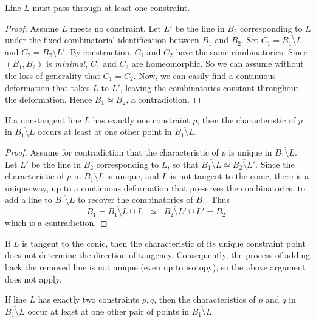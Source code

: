 \documentclass{svproc}
\begin{document}
\begin{lemma}\label{lemma_1}
Line $L$ must pass through at least one constraint.
\end{lemma}

\begin{proof}
Assume $L$ meets no constraint. Let $L'$ be the line in $B_2$ corresponding to $L$ under the fixed combinatorial identification between $B_1$ and $B_2$. 
Set $C_1=\overline{B_1\setminus L}$ and $C_2=\overline{B_2\setminus L'}$. 
By construction, $C_1$ and $C_2$ have the same combinatorics. Since $(B_1,B_2)$ is \emph{minimal}, $C_1$ and $C_2$ are homeomorphic. So we can assume without the loss of generality that $C_1 = C_2$. Now, we can easily find a continuous deformation that takes $L$ to $L'$, leaving the combinatorics constant throughout the deformation. Hence $B_1 \simeq B_2$, a contradiction.
\end{proof}

\begin{lemma}\label{lemma2}
If a non-tangent line $L$ has exactly one constraint $p$, then the characteristic of $p$ in 
$\overline{B_1 \setminus L}$ occurs at least at one other point in $\overline{B_1 \setminus L}$.
\end{lemma}

\begin{proof}
Assume for contradiction that the characteristic of $p$ is unique in 
$\overline{B_1 \setminus L}$.  
Let $L'$ be the line in $B_2$ corresponding to $L$, so that 
$\overline{B_1 \setminus L} \simeq \overline{B_2 \setminus L'}$.  
Since the characteristic of $p$ in $\overline{B_1 \setminus L}$ is unique, and $L$ is not tangent to the conic, there is a unique way, up to a continuous deformation that preserves the combinatorics, to add a line to $\overline{B_1 \setminus L}$ to recover 
the combinatorics of $B_1$.  
Thus
\[
B_1 = \overline{B_1 \setminus L} \cup L \;\;\simeq\;\; 
\overline{B_2 \setminus L'} \cup L' = B_2,
\]
which is a contradiction.
\end{proof}
\begin{remark}
  If $L$ is tangent to the conic, then the characteristic of its unique constraint point does not determine the direction of tangency. Consequently, the process of adding back the removed line is not unique (even up to isotopy), so the above argument does not apply.  
\end{remark}


\begin{lemma}
If line $L$ has exactly two constraints $p, q$, then the characteristics of $p$ and $q$ in 
$\overline{B_1 \setminus L}$ occur at least at one other pair of points in $\overline{B_1 \setminus L}$.
\end{lemma}
\end{document}
